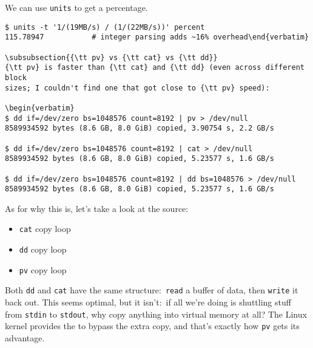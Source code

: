 We can use {\tt units} to get a percentage.

\begin{verbatim}
$ units -t '1/(19MB/s) / (1/(22MB/s))' percent
115.78947           # integer parsing adds ~16% overhead\end{verbatim}

\subsubsection{{\tt pv} vs {\tt cat} vs {\tt dd}}
{\tt pv} is faster than {\tt cat} and {\tt dd} (even across different block
sizes; I couldn't find one that got close to {\tt pv} speed):

\begin{verbatim}
$ dd if=/dev/zero bs=1048576 count=8192 | pv > /dev/null
8589934592 bytes (8.6 GB, 8.0 GiB) copied, 3.90754 s, 2.2 GB/s

$ dd if=/dev/zero bs=1048576 count=8192 | cat > /dev/null
8589934592 bytes (8.6 GB, 8.0 GiB) copied, 5.23577 s, 1.6 GB/s

$ dd if=/dev/zero bs=1048576 count=8192 | dd bs=1048576 > /dev/null
8589934592 bytes (8.6 GB, 8.0 GiB) copied, 5.23577 s, 1.6 GB/s\end{verbatim}

As for why this is, let's take a look at the source:

\begin{itemize}
  \item {}
            {{\tt cat} copy loop}
  \item {}
            {{\tt dd} copy loop}
  \item {}
            {{\tt pv} copy loop}
\end{itemize}

Both {\tt dd} and {\tt cat} have the same structure:~{\tt read} a buffer of
data, then {\tt write} it back out. This seems optimal, but it isn't:~if all
we're doing is shuttling stuff from {\tt stdin} to {\tt stdout}, why copy
anything into virtual memory at all? The Linux kernel provides the
to bypass the extra copy, and that's exactly how {\tt pv} gets its advantage.

